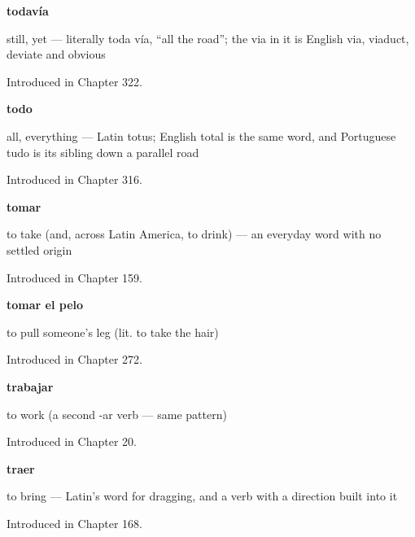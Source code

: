 \noindent\begin{minipage}[t]{\linewidth}
\raggedright
\textbf{todavía}\par
\small still, yet — literally toda vía, \textquotedblleft{}all the road\textquotedblright{}; the via in it is English via, viaduct, deviate and obvious\par
\footnotesize Introduced in Chapter 322.
\end{minipage}\par\medskip

\noindent\begin{minipage}[t]{\linewidth}
\raggedright
\textbf{todo}\par
\small all, everything — Latin totus; English total is the same word, and Portuguese tudo is its sibling down a parallel road\par
\footnotesize Introduced in Chapter 316.
\end{minipage}\par\medskip

\noindent\begin{minipage}[t]{\linewidth}
\raggedright
\textbf{tomar}\par
\small to take (and, across Latin America, to drink) — an everyday word with no settled origin\par
\footnotesize Introduced in Chapter 159.
\end{minipage}\par\medskip

\noindent\begin{minipage}[t]{\linewidth}
\raggedright
\textbf{tomar el pelo}\par
\small to pull someone's leg (lit. to take the hair)\par
\footnotesize Introduced in Chapter 272.
\end{minipage}\par\medskip

\noindent\begin{minipage}[t]{\linewidth}
\raggedright
\textbf{trabajar}\par
\small to work (a second -ar verb — same pattern)\par
\footnotesize Introduced in Chapter 20.
\end{minipage}\par\medskip

\noindent\begin{minipage}[t]{\linewidth}
\raggedright
\textbf{traer}\par
\small to bring — Latin's word for dragging, and a verb with a direction built into it\par
\footnotesize Introduced in Chapter 168.
\end{minipage}\par\medskip

